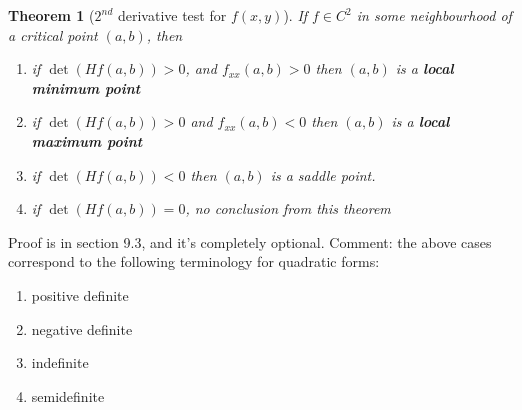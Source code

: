 \documentclass[tikz,10pt,letter]{article}
\theoremstyle{plain}
\newtheorem*{theorem*}{Theorem}
\theoremstyle{definition}
\begin{document}
\begin{theorem*}[$2^{nd}$ derivative test for $f(x,y)$]
     If $f\in C^2$ in some neighbourhood of a critical point $(a,b)$, then \begin{enumerate}
         \item if $\det(Hf(a,b))>0$, and $f_{xx}(a,b)>0$ then $(a,b)$ is a \textbf{local minimum point} 
         \item if $\det(Hf(a,b))>0$ and $f_{xx}(a,b)<0$ then $(a,b)$ is a \textbf{local maximum point} 
         \item if $\det(Hf(a,b))<0$ then $(a,b)$ is a saddle point. 
         \item if $\det(Hf(a,b))=0$, no conclusion from this theorem
     \end{enumerate}
\end{theorem*}
Proof is in section 9.3, and it's completely optional. Comment: the above cases correspond to the following terminology for quadratic forms:\begin{enumerate}
    \item positive definite 
    \item negative definite 
    \item indefinite
    \item semidefinite
\end{enumerate}
\end{document}

